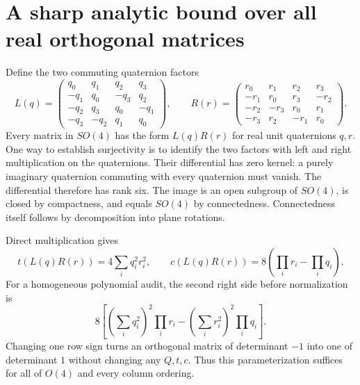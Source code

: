 \documentclass[11pt,a4paper]{article}
\begin{document}
\section{A sharp analytic bound over all real orthogonal matrices}
Define the two commuting quaternion factors
\[
L(q)=\begin{pmatrix}
q_0&q_1&q_2&q_3\\-q_1&q_0&-q_3&q_2\\-q_2&q_3&q_0&-q_1\\-q_3&-q_2&q_1&q_0
\end{pmatrix},\qquad
R(r)=\begin{pmatrix}
r_0&r_1&r_2&r_3\\-r_1&r_0&r_3&-r_2\\-r_2&-r_3&r_0&r_1\\-r_3&r_2&-r_1&r_0
\end{pmatrix}.
\]
Every matrix in $SO(4)$ has the form $L(q)R(r)$ for real unit quaternions $q,r$. One way to establish surjectivity is to identify the two factors with left and right multiplication on the quaternions. Their differential has zero kernel: a purely imaginary quaternion commuting with every quaternion must vanish. The differential therefore has rank six. The image is an open subgroup of $SO(4)$, is closed by compactness, and equals $SO(4)$ by connectedness. Connectedness itself follows by decomposition into plane rotations.

Direct multiplication gives
\begin{equation}\label{eq:orthidentity}
t(L(q)R(r))=4\sum_iq_i^2r_i^2,\qquad
c(L(q)R(r))=8\left(\prod_i r_i-\prod_i q_i\right).
\end{equation}
For a homogeneous polynomial audit, the second right side before normalization is
\[
8\left[\left(\sum_iq_i^2\right)^2\prod_i r_i-
\left(\sum_i r_i^2\right)^2\prod_i q_i\right].
\]
Changing one row sign turns an orthogonal matrix of determinant $-1$ into one of determinant $1$ without changing any $Q,t,c$. Thus this parameterization suffices for all of $O(4)$ and every column ordering.
\end{document}
